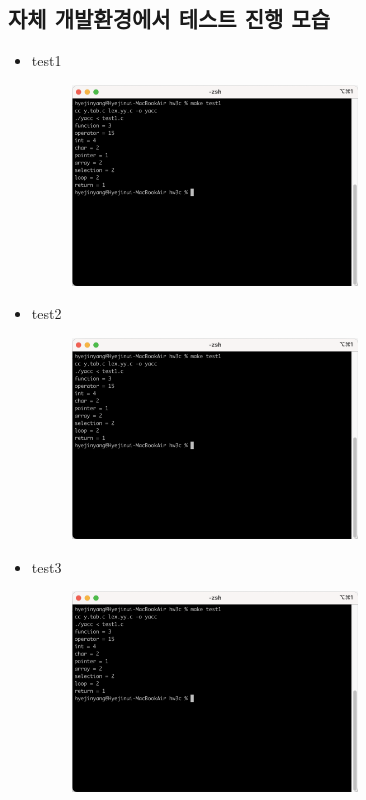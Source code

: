 \documentclass{article}
\begin{document}
\subsection{자체 개발환경에서 테스트 진행 모습}
\begin{itemize}
	\item {test1}
	\begin{figure}[!htbp]
		\begin{center}
			\includegraphics[width=215pt]{hw3_maketest1.png}
		\end{center}
	\end{figure}
	\item {test2}
	\begin{figure}[!htbp]
		\begin{center}
			\includegraphics[width=215pt]{hw3_maketest1.png}
		\end{center}
	\end{figure}
	\item {test3}
	\begin{figure}[!htbp]
		\begin{center}
			\includegraphics[width=215pt]{hw3_maketest1.png}
		\end{center}
	\end{figure}
\end{itemize}
\end{document}
